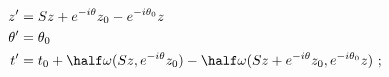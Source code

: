 \begin{equation}
  \label{eq:orbit+}
  \begin{aligned}
    z' &= Sz + e^{-i\theta} z_0 - e^{-i\theta_0} z\\
    \theta' &= \theta_0\\
    t' &= t_0 + \half \omega(Sz, e^{-i\theta}z_0) - \half \omega(Sz +
    e^{-i\theta}z_0, e^{-i\theta_0} z)~;
  \end{aligned}
\end{equation}

